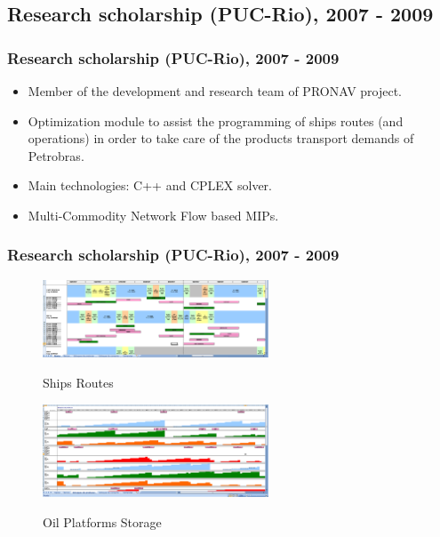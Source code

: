 \documentclass{beamer}
\begin{document}
\begin{frame}
{\begin{itemize}
	  \end{itemize}	  		
}
\end{frame}

\subsection{Research scholarship (PUC-Rio), 2007 - 2009}

\begin{frame}
	\frametitle{Research scholarship (PUC-Rio), 2007 - 2009}
{
	\begin{itemize}
	  \item<1-> Member of the development and research team of PRONAV project.
	  \item<2-> Optimization module to assist the programming of ships routes (and
	  operations) in order to take care of the products transport demands of
	  Petrobras.	  
	  \item<3-> Main technologies: C++ and CPLEX solver.
	  \item<4-> Multi-Commodity Network Flow based MIPs.	  	    	  
	\end{itemize}
}
\end{frame}

\begin{frame}
	\frametitle{Research scholarship (PUC-Rio), 2007 - 2009}
{
	\begin{figure}[htbp]			
		\centering
		\includegraphics[width=0.60\textwidth]{images/navios.png}
		\label{fig:navios}
		\caption{\small{Ships Routes}}							
	\end{figure}	
	\begin{figure}[htbp]			
		\centering
		\includegraphics[width=0.60\textwidth]{images/estoques.png}
		\label{fig:estoques}
		\caption{\small{Oil Platforms Storage}}							
	\end{figure}
}
\end{frame}
\end{document}
